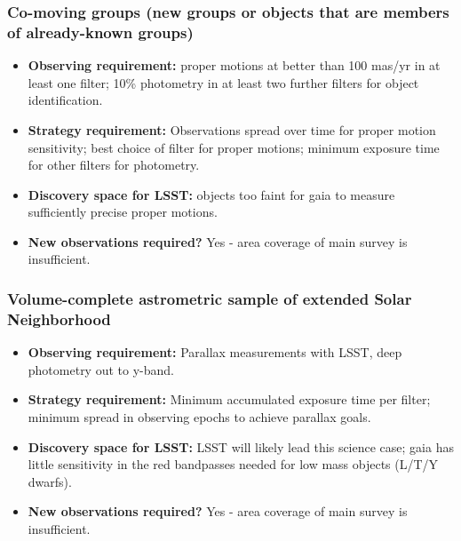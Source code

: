 \subsubsection{Co-moving groups (new groups or objects that are members of already-known groups)}
\vspace{-2mm}
\begin{itemize}
\item {\bf Observing requirement:}  proper motions at better than 100 mas/yr in at least one filter; 10\% photometry in at least two further filters for object identification.
\vspace{-2mm}

\item {\bf Strategy requirement:} Observations spread over time for proper motion sensitivity; best choice of filter for proper motions; minimum exposure time for other filters for photometry.
\vspace{-2mm}

\item {\bf Discovery space for LSST:} objects too faint for gaia to measure sufficiently precise proper motions.
\vspace{-2mm}

\item {\bf New observations required?} Yes - area coverage of main survey is insufficient.
\vspace{-2mm}
\end{itemize}

\subsubsection{Volume-complete astrometric sample of extended Solar Neighborhood}
\vspace{-2mm}
\begin{itemize}

\item {\bf Observing requirement:} Parallax measurements with LSST, deep photometry out to y-band.
\vspace{-2mm}

\item {\bf Strategy requirement:} Minimum accumulated exposure time per filter; minimum spread in observing epochs to achieve parallax goals.
\vspace{-2mm}

\item {\bf Discovery space for LSST:} LSST will likely lead this science case; gaia has little sensitivity in the red bandpasses needed for low mass objects (L/T/Y dwarfs).
\vspace{-2mm}

\item {\bf New observations required?} Yes - area coverage of main survey is insufficient.
\vspace{-2mm}
\end{itemize}


